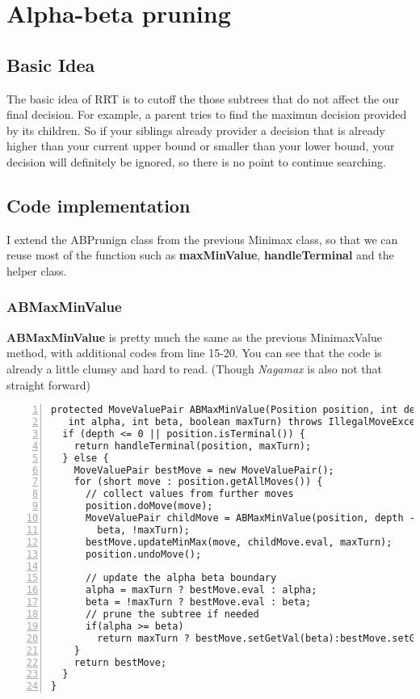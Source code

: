 \documentclass{article}
\begin{document}
\clearpage
\section{Alpha-beta pruning}
\subsection{Basic Idea}
The basic idea of RRT is to cutoff the those subtrees that do not affect the our final decision. For example, a parent tries to find the maximun decision provided by its children. So if your siblings already provider a decision that is already higher than your current upper bound or smaller than your lower bound, your decision will definitely be ignored, so there is no point to continue searching.

\subsection{Code implementation}

I extend the ABPrunign class from the previous Minimax class, so that we can reuse most of the function such as \textbf{maxMinValue}, \textbf{handleTerminal} and the helper class.

\subsubsection{ABMaxMinValue}

\textbf{ABMaxMinValue} is pretty much the same as the previous MinimaxValue method, with additional codes from line 15-20. You can see that the code is already a little clumsy and hard to read. (Though \emph{Nagamax} is also not that straight forward)

\begin{lstlisting}[numbers=left]
protected MoveValuePair ABMaxMinValue(Position position, int depth,
   int alpha, int beta, boolean maxTurn) throws IllegalMoveException {
  if (depth <= 0 || position.isTerminal()) {
    return handleTerminal(position, maxTurn);
  } else {
    MoveValuePair bestMove = new MoveValuePair();
    for (short move : position.getAllMoves()) {
      // collect values from further moves
      position.doMove(move);
      MoveValuePair childMove = ABMaxMinValue(position, depth - 1, alpha,
        beta, !maxTurn);
      bestMove.updateMinMax(move, childMove.eval, maxTurn);
      position.undoMove();

      // update the alpha beta boundary
      alpha = maxTurn ? bestMove.eval : alpha;
      beta = !maxTurn ? bestMove.eval : beta;
      // prune the subtree if needed
      if(alpha >= beta)
        return maxTurn ? bestMove.setGetVal(beta):bestMove.setGetVal(alpha);
    }
    return bestMove;
  }
}
\end{lstlisting}
\end{document}
